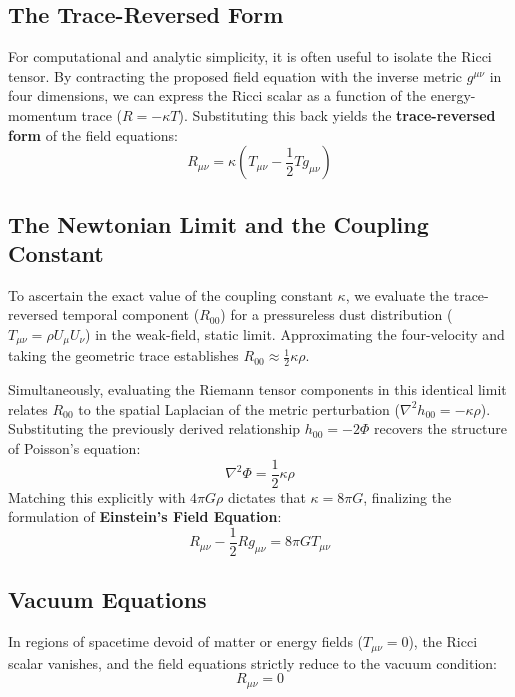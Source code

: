 \documentclass[11pt, a4paper]{report}
\begin{document}
\subsection{The Trace-Reversed Form}
For computational and analytic simplicity, it is often useful to isolate the Ricci tensor. By contracting the proposed field equation with the inverse metric $g^{\mu\nu}$ in four dimensions, we can express the Ricci scalar as a function of the energy-momentum trace ($R = -\kappa T$). Substituting this back yields the \textbf{trace-reversed form} of the field equations:
\begin{equation}
\label{eq:einstein_trace_reversed}
R_{\mu\nu} = \kappa \left( T_{\mu\nu} - \frac{1}{2}T g_{\mu\nu} \right)
\end{equation}

\subsection{The Newtonian Limit and the Coupling Constant}
To ascertain the exact value of the coupling constant $\kappa$, we evaluate the trace-reversed temporal component ($R_{00}$) for a pressureless dust distribution ($T_{\mu\nu} = \rho U_{\mu}U_{\nu}$) in the weak-field, static limit. Approximating the four-velocity and taking the geometric trace establishes $R_{00} \approx \frac{1}{2}\kappa\rho$. 

Simultaneously, evaluating the Riemann tensor components in this identical limit relates $R_{00}$ to the spatial Laplacian of the metric perturbation ($\nabla^{2}h_{00} = -\kappa\rho$). Substituting the previously derived relationship $h_{00} = -2\Phi$ recovers the structure of Poisson's equation:
\begin{equation}
\nabla^{2}\Phi = \frac{1}{2}\kappa\rho
\end{equation}
Matching this explicitly with $4\pi G\rho$ dictates that $\kappa = 8\pi G$, finalizing the formulation of \textbf{Einstein's Field Equation}:
\begin{equation}
\label{eq:einstein_field_equation}
R_{\mu\nu} - \frac{1}{2}R g_{\mu\nu} = 8\pi G T_{\mu\nu}
\end{equation}

\subsection{Vacuum Equations}
In regions of spacetime devoid of matter or energy fields ($T_{\mu\nu} = 0$), the Ricci scalar vanishes, and the field equations strictly reduce to the vacuum condition:
\begin{equation}
R_{\mu\nu} = 0
\end{equation}
\end{document}
